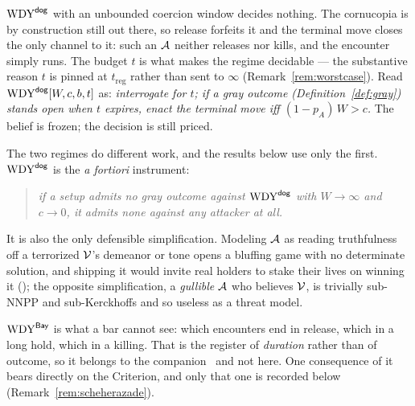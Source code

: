 \begin{remark}\label{rem:regimes}
$\mathrm{WDY}^{\mathsf{dog}}$ with an unbounded coercion window decides nothing. The cornucopia is
by construction still out there, so release forfeits it and the terminal move
closes the only channel to it: such an $\mathcal{A}$ neither releases nor kills,
and the encounter simply runs. The budget $t$ is what makes the regime
decidable --- the substantive reason $t$ is pinned at $t_{\mathrm{reg}}$ rather
than sent to $\infty$ (Remark~\ref{rem:worstcase}). Read
$\mathrm{WDY}^{\mathsf{dog}}[W,c,b,t]$ as: \emph{interrogate for $t$; if a gray outcome
(Definition~\ref{def:gray}) stands open when $t$ expires, enact the terminal move
iff $(1-p_A)\,W > c$.} The belief is frozen; the decision is still priced.

The two regimes do different work, and the results below use only the first.
$\mathrm{WDY}^{\mathsf{dog}}$ is the \emph{a fortiori} instrument:
\begin{quote}\itshape
if a setup admits no gray outcome against $\mathrm{WDY}^{\mathsf{dog}}$ with $W\!\to\!\infty$ and
$c\!\to\!0$, it admits none against any attacker at all.
\end{quote}
It is also the only defensible simplification. Modeling $\mathcal{A}$ as reading
truthfulness off a terrorized $\mathcal{V}$'s demeanor or tone opens a bluffing game
with no determinate solution, and shipping it would invite real holders to stake
their lives on winning it (\cite[\S3]{denial-spiral}); the opposite
simplification, a \emph{gullible} $\mathcal{A}$ who believes $\mathcal{V}$, is
trivially sub-NNPP and sub-Kerckhoffs and so useless as a threat model.

$\mathrm{WDY}^{\mathsf{Bay}}$ is what a bar cannot see: which encounters end in release, which in a
long hold, which in a killing. That is the register of \emph{duration} rather
than of outcome, so it belongs to the companion~\cite[\S4]{denial-spiral} and
not here. One consequence of it bears directly on the Criterion, and only that
one is recorded below (Remark~\ref{rem:scheherazade}).
\end{remark}

